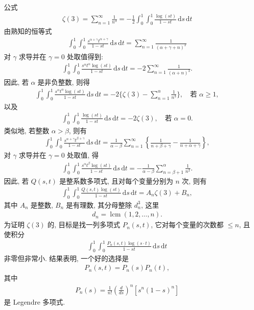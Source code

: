 公式
\begin{align*}
  \zeta(3)=\sum_{n=1}^{\infty}\frac{1}{n^{3}}
  =-\frac{1}{2}\int_{0}^{1}\int_{0}^{1}\frac{\log(st)}{1-st}\,\mathrm{d}s\,\mathrm{d}t
\end{align*}
由熟知的恒等式
\begin{align*}
  \int_{0}^{1}\int_{0}^{1}\frac{s^{\alpha+\gamma}t^{\alpha+\gamma}}{1-st}\,\mathrm{d}s\,\mathrm{d}t
  =\sum_{n=1}^{\infty}\frac{1}{(\alpha+\gamma+n)^{2}}
\end{align*}
对 $\gamma$ 求导并在 $\gamma = 0$ 处取值得到:
\begin{align*}
  \int_{0}^{1}\int_{0}^{1}\frac{s^{\alpha}t^{\alpha}\log(st)}{1-st}\,\mathrm{d}s\,\mathrm{d}t
  =-2\sum_{n=1}^{\infty}\frac{1}{(\alpha+n)^{3}}.
\end{align*}
因此, 若 $\alpha$ 是非负整数, 则得
\begin{align*}
  \int_{0}^{1}\int_{0}^{1}\frac{s^{\alpha}t^{\alpha}\log(st)}{1-st}\,\mathrm{d}s\,\mathrm{d}t
  =-2\Big\{\zeta(3)-\sum_{n=1}^{\alpha}\frac{1}{n^{3}}\Big\},\quad\text{若 } \alpha\geq 1,
\end{align*}
以及
\begin{align*}
  \int_{0}^{1}\int_{0}^{1}\frac{\log(st)}{1-st}\,\mathrm{d}s\,\mathrm{d}t
  =-2\zeta(3),\quad\text{若 } \alpha= 0.
\end{align*}
类似地, 若整数 $\alpha > \beta$, 则有
\begin{align*}
  \int_{0}^{1}\int_{0}^{1}\frac{s^{\alpha+\gamma}t^{\beta+\gamma}}{1-s t}\,\mathrm{d}s\,\mathrm{d}t
  =\frac{1}{\alpha-\beta}\sum_{n=1}^{\infty}
  \left\{\frac{1}{n+\beta+\gamma}-\frac{1}{n+\alpha+\gamma}\right\},
\end{align*}
对 $\gamma$ 求导并在 $\gamma = 0$ 处取值, 得
\begin{align*}
  \int_{0}^{1}\int_{0}^{1}\frac{s^{\alpha}t^{\beta}\log(st)}{1-st}\,\mathrm{d}s\,\mathrm{d}t
  =-\frac{1}{\alpha-\beta}\sum_{n=\beta+1}^{\alpha}\frac{1}{n^{2}}.
\end{align*}
因此, 若 $Q(s,t)$ 是整系数多项式, 且对每个变量分别为 $n$ 次, 则有
\begin{align*}
  \int_{0}^{1}\int_{0}^{1}\frac{Q(s,t)\log(s t)}{1-s t}\,\mathrm{d}s\,\mathrm{d}t
  =A_{n}\zeta(3)+B_{n},
\end{align*}
其中 $A_{n}$ 是整数, $B_{n}$ 是有理数, 其分母整除 $d_{n}^{3}$, 这里
\begin{align*}
  d_{n}=\operatorname{lcm}(1,2,\ldots,n).
\end{align*}
为证明 $\zeta(3)$ 的, 目标是找一列多项式 $P_n(s, t)$, 它对每个变量的次数都 $\leq n$, 且使积分
\begin{align*}
  \int_{0}^{1}\int_{0}^{1}\frac{P_{n}(s,t)\log(s\cdot t)}{1-s t}\,\mathrm{d}s\,\mathrm{d}t
\end{align*}
非零但非常小. 结果表明, 一个好的选择是
\begin{align*}
  P_{n}(s,t)=P_{n}(s)P_{n}(t),
\end{align*}
其中
\begin{align*}
  P_{n}(s)=\frac{1}{n!}\left(\frac{d}{ds}\right)^{n}[s^{n}(1-s)^{n}]
\end{align*}
是 Legendre 多项式.

